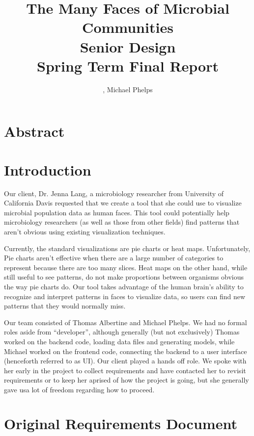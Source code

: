 \documentclass[letterpaper,10pt, onecolumn, draftclsnofoot]{IEEEtran}
\title{The Many Faces of Microbial Communities \\\large Senior Design\\Spring Term Final Report\\}
\author{\name, Michael Phelps}
\begin{document}
\maketitle
\section{Abstract}

\clearpage

\tableofcontents

\section{Introduction}
Our client, Dr. Jenna Lang, a microbiology researcher from University of California Davis requested that we create a tool that she could use to visualize microbial population data as human faces. This tool could potentially help microbiology researchers (as well as those from other fields) find patterns that aren't obvious using existing visualization techniques. 

Currently, the standard visualizations are pie charts or heat maps. Unfortunately, Pie charts aren't effective when there are a large number of categories to represent because there are too many slices. Heat maps on the other hand, while still useful to see patterns, do not make proportions between organisms obvious the way pie charts do. Our tool takes advantage of the human brain's ability to recognize and interpret patterns in faces to visualize data, so users can find new patterns that they would normally miss.

Our team consisted of Thomas Albertine and Michael Phelps. We had no formal roles aside from ``developer'', although generally (but not exclusively) Thomas worked on the backend code, loading data files and generating models, while Michael worked on the frontend code, connecting the backend to a user interface (henceforth referred to as UI). Our client played a hands off role. We spoke with her early in the project to collect requirements and have contacted her to revisit requirements or to keep her aprised of how the project is going, but she generally gave usa lot of freedom regarding how to proceed.

\section{Original Requirements Document}
\end{document}
